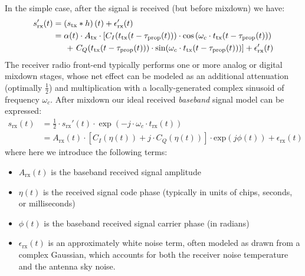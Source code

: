 \documentclass{article}
\begin{document}
In the simple case, after the signal is received (but before mixdown) we have:
%
\begin{align*}
s_\text{rx}'(t) &= \left(s_\text{tx} * h\right)(t) + \epsilon_\text{rx}'(t)  \\
&= \alpha(t) \cdot A_\text{tx} \cdot \left[ C_I(t_\text{tx}(t-\tau_\text{prop}(t))) \cdot \text{cos}\left( \omega_c \cdot t_\text{tx}(t-\tau_\text{prop}(t)) \right) \right. \\ & \hspace{5mm} \left. + \ C_Q(t_\text{tx}(t-\tau_\text{prop}(t)))\cdot\sin(\omega_c \cdot t_\text{tx}(t-\tau_\text{prop}(t))) \right] + \epsilon_\text{rx}'(t)
\end{align*}
%
The receiver radio front-end typically performs one or more analog or digital mixdown stages, whose net effect can be modeled as an additional attenuation (optimally $\frac{1}{2}$) and multiplication with a locally-generated complex sinusoid of frequency $\omega_c$.  After mixdown our ideal received \textit{baseband} signal model can be expressed:
%
\begin{align}
    s_\text{rx}(t) &= \frac{1}{2} \cdot s_\text{rx}'(t) \cdot \exp(-j\cdot \omega_c \cdot t_\text{rx}(t))  \nonumber \\
    &= A_\text{rx}(t) \cdot \left[ C_I (\eta(t)) + j \cdot C_Q(\eta(t)) \right] \cdot \text{exp}\left( j \phi(t) \right)  + \epsilon_\text{rx}(t)
\end{align}
%
where here we introduce the following terms:
\begin{itemize}
    \item $A_\text{rx}(t)$ is the baseband received signal amplitude
    \item $\eta(t)$ is the received signal code phase (typically in units of chips, seconds, or milliseconds)
    \item $\phi(t)$ is the baseband received signal carrier phase (in radians)
    \item $\epsilon_\text{rx}(t)$ is an approximately white noise term, often modeled as drawn from a complex Gaussian, which accounts for both the receiver noise temperature and the antenna sky noise.
\end{itemize}
\end{document}

